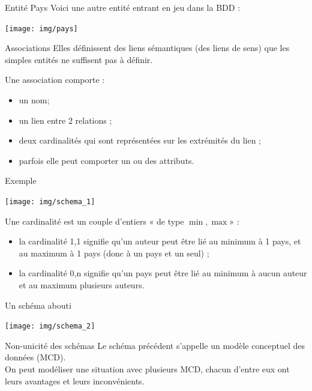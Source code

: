 \documentclass[10pt]{nsibeamer}
\begin{document}
\begin{frame}{Entité Pays}
Voici une autre entité entrant en jeu dans la BDD :
\begin{center}
\texttt{[image: img/pays]}
\end{center}

\end{frame}
\begin{frame}{Associations}
Elles définissent des \alert{liens sémantiques} (des liens de sens)	 que les simples entités ne suffisent pas à définir.\\\pause

Une association comporte :\pause
\begin{itemize}
	\item	un nom;\pause
    \item 	un lien entre 2 relations ;\pause
	\item	deux cardinalités qui sont représentées sur les extrémités du lien ;\pause
    \item 	parfois elle peut comporter un ou des attributs.
\end{itemize}
\end{frame}
\begin{frame}{Exemple}
	\begin{center}
    \texttt{[image: img/schema\_1]}
    \end{center}\pause
    Une cardinalité est un couple d'entiers « de type $\min, \max$» :\pause
    \begin{itemize}
    	\item	la cardinalité 1,1 signifie qu'un auteur peut être lié au minimum à 1 pays, et au maximum à 1 pays (donc à un pays et un seul) ;\pause
    	\item	la cardinalité 0,n signifie qu'un pays peut être lié au minimum à aucun auteur et au maximum plusieurs auteurs.\pause
    \end{itemize}
\end{frame}
\begin{frame}{Un schéma abouti}
\begin{center}
 \texttt{[image: img/schema\_2]}
 \end{center}
\end{frame}
\begin{frame}{Non-unicité des schémas}
    Le schéma précédent s'appelle un modèle conceptuel des données (MCD).\\\pause
	On peut modéliser une situation avec plusieurs MCD, chacun d'entre eux ont leurs avantages et leurs inconvénients.\pause
\end{frame}
\end{document}
